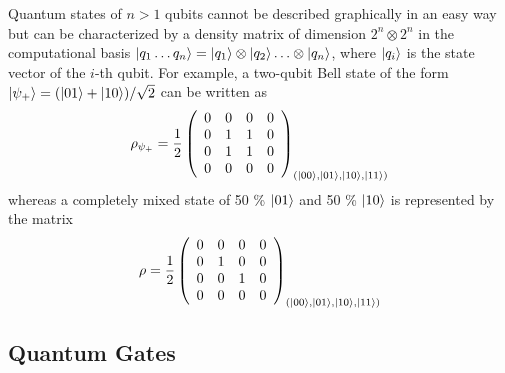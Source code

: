\smallskip

Quantum states of $n>1$ qubits cannot be described graphically in an easy way but can be characterized by a density matrix of dimension $2^n\otimes 2^n$ in the computational basis $\left| q_1\hdots q_n \right>=\left| q_1 \right>\otimes\left| q_{2} \right>\hdots\otimes\left| q_n \right>$, where $\left| q_i \right>$ is the state vector of the $i$-th qubit. For example, a two-qubit Bell state of the form $\left| \psi_+ \right>=(\left| 01 \right>+\left| 10 \right>)/\sqrt{2}$ can be written as
%
\begin{equation}
\rho_{\psi_+} = \frac{1}{2}\left( \begin{array}{cccc} 0 & 0 & 0 & 0 \\ 0 & 1 & 1 & 0 \\ 0 & 1 & 1 & 0 \\ 0 & 0 & 0 & 0 \end{array} \right)_{(\left| 00 \right>,\left| 01 \right>,\left| 10 \right>,\left| 11 \right>)}
\end{equation}
%
whereas a completely mixed state of 50 \% $\left| 01 \right>$ and 50 \% $\left| 10 \right>$ is represented by the matrix
%
\begin{equation}
\rho = \frac{1}{2}\left( \begin{array}{cccc} 0 & 0 & 0 & 0 \\ 0 & 1 & 0 & 0 \\ 0 & 0 & 1 & 0 \\ 0 & 0 & 0 & 0 \end{array} \right)_{(\left| 00 \right>,\left| 01 \right>,\left| 10 \right>,\left| 11 \right>)}
\end{equation}
%

\subsection{Quantum Gates}

